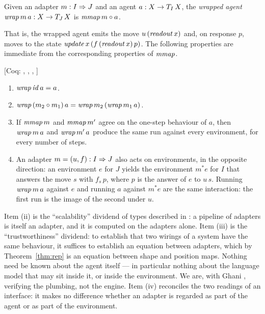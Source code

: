 \documentclass{fundam}
\begin{document}
\begin{definition}[Wrapping]\label{def:wrap}
  Given an adapter $m : I \Rightarrow J$ and an agent $a : X \to T_{I}\,X$, the
  \emph{wrapped agent} $\mathit{wrap}\,m\,a : X \to T_{J}\,X$ is $\mathit{mmap}\,m \circ a$.
\end{definition}

That is, the wrapped agent emits the move $u\,(\mathit{readout}\,x)$ and, on response $p$,
moves to the state $\mathit{update}\,x\,(f\,(\mathit{readout}\,x)\,p)$.  The following properties
are immediate from the corresponding properties of $\mathit{mmap}$.

\begin{proposition}\label{prop:wrap}
  \textsf{[Coq: , , , ]}
  \leavevmode
  \begin{enumerate}[label=(\roman*),leftmargin=2em]
  \item $\mathit{wrap}\,\mathit{id}\,a = a$.
  \item $\mathit{wrap}\,(m_2 \circ m_1)\,a = \mathit{wrap}\,m_2\,(\mathit{wrap}\,m_1\,a)$.
  \item If $\mathit{mmap}\,m$ and $\mathit{mmap}\,m'$ agree on the one-step behaviour of $a$, then
    $\mathit{wrap}\,m\,a$ and $\mathit{wrap}\,m'\,a$ produce the same run against every
    environment, for every number of steps.
  \item An adapter $m = (u,f) : I \Rightarrow J$ also acts on environments, in the opposite
    direction: an environment $e$ for $J$ yields the environment $m^{*}e$ for $I$ that
    answers the move $s$ with $f_s\,p$, where $p$ is the answer of $e$ to $u\,s$.
    Running $\mathit{wrap}\,m\,a$ against $e$ and running $a$ against $m^{*}e$ are the same
    interaction: the first run is the image of the second under $u$.
  \end{enumerate}
\end{proposition}

Item (ii) is the ``scalability'' dividend of types described in \cite{GhaniPodcast26}:
a pipeline of adapters is itself an adapter, and it is computed on the adapters alone.
Item (iii) is the ``trustworthiness'' dividend: to establish that two wirings of a system
have the same behaviour, it suffices to establish an equation between adapters, which by
Theorem~\ref{thm:rep} is an equation between shape and position maps.  Nothing need be
known about the agent itself --- in particular nothing about the language model that may
sit inside it, or inside the environment.  We are, with Ghani \cite{GhaniPodcast26},
verifying the plumbing, not the engine.  Item (iv) reconciles the two readings of an
interface: it makes no difference whether an adapter is regarded as part of the agent or
as part of the environment.
\end{document}
